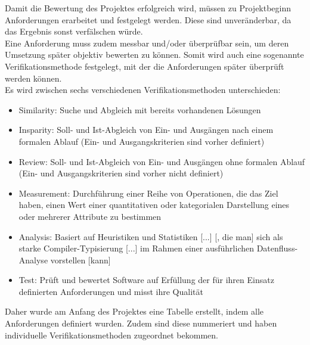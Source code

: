 \label{Anforderungen}

Damit die Bewertung des Projektes erfolgreich wird, müssen zu Projektbeginn Anforderungen erarbeitet und festgelegt werden. Diese sind unveränderbar, da das Ergebnis sonst verfälschen würde. \\
Eine Anforderung muss zudem messbar und/oder überprüfbar sein, um deren Umsetzung später objektiv bewerten zu können. Somit wird auch eine sogenannte Verifikationsmethode festgelegt, mit der die Anforderungen später überprüft werden können. \\
Es wird zwischen sechs verschiedenen Verifikationsmethoden unterschieden:

\begin{itemize}
	\item Similarity: Suche und Abgleich mit bereits vorhandenen Lösungen \cite[S. 122]{HelgaMeyer.}
	\item Insparity: Soll- und Ist-Abgleich von Ein- und Ausgängen nach einem formalen Ablauf (Ein- und Ausgangskriterien sind vorher definiert) \cite[vgl. S. 308]{PeterLiggesmeyer.2009}
	\item Review: Soll- und Ist-Abgleich von Ein- und Ausgängen ohne formalen Ablauf (Ein- und Ausgangskriterien sind vorher nicht definiert) \cite[vgl. S. 317]{PeterLiggesmeyer.2009}
	\item Measurement: Durchführung einer Reihe von Operationen, die das Ziel haben, einen Wert einer quantitativen oder kategorialen Darstellung eines oder mehrerer Attribute zu bestimmen \cite[vgl. S. 395]{DepartmentofResearch&DevelopmentDepartmentofInformationTechnologiesandSystems.}
	\item Analysis: Basiert auf Heuristiken und Statistiken [...] [, die man] sich als starke Compiler-Typisierung [...] im Rahmen einer ausführlichen Datenfluss-Analyse vorstellen [kann] \cite[vgl. S. 4]{JayAbrahamPaulJonesRaoulJetley.}
	\item Test: Prüft und bewertet Software auf Erfüllung der für ihren Einsatz definierten Anforderungen und misst ihre Qualität \cite{Wikipedia.01.03.2020}
\end{itemize}

\newpage

Daher wurde am Anfang des Projektes eine Tabelle erstellt, indem alle Anforderungen definiert wurden. Zudem sind diese nummeriert und haben individuelle Verifikationsmethoden zugeordnet bekommen. \\

